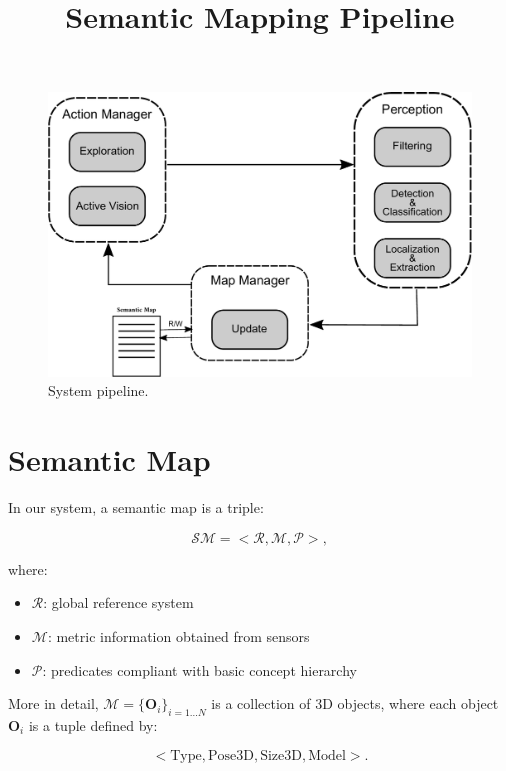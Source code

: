 \documentclass{article}
\title{\LARGE \bf Semantic Mapping Pipeline}
\begin{document}
	
	\maketitle	
	
	\begin{figure}[htbp]
		\centering
		\includegraphics[width=\linewidth]{pics/drawing-crop.pdf}
		\caption{System pipeline.}
		\label{fig:pipeline}
	\end{figure}
	
	\section{Semantic Map}
	
	In our system, a semantic map is a triple:
	
	\begin{equation}
		\mathcal{SM} = < \mathcal{R}, \mathcal{M}, \mathcal{P} >,
	\end{equation}
	
	\noindent
	where:
	
	\begin{itemize}
		\item $\mathcal{R}$: global reference system
		\item $\mathcal{M}$: metric information obtained from sensors
		\item $\mathcal{P}$: predicates compliant with basic concept hierarchy
	\end{itemize}
	
	More in detail, $\mathcal{M} = \{\mathbf{O}_i\}_{i=1 \dots N}$ is a collection of 3D objects, where each object $\mathbf{O}_i$ is a tuple defined by:
	
	\begin{equation}
			 <\text{Type},\text{Pose3D},\text{Size3D},\text{Model}>.
	\end{equation}
	
\end{document}
